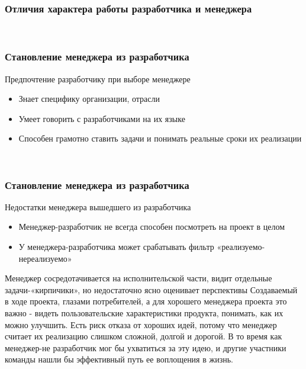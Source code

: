 \documentclass{../industrial-development}
\begin{document}
~\cite{How_to_be_a_good_IT-manager}

\begin{frame} \frametitle{Отличия характера работы разработчика и менеджера}
\end{frame}
\lecturenotes

~\cite{How_to_be_a_good_IT-manager}

\begin{frame} \frametitle{Становление менеджера из разработчика}
	\begin{block}{Предпочтение разработчику при выборе менеджере}
	 \begin{itemize}
                        \item Знает специфику организации, отрасли
			\item Умеет говорить с разработчиками на их языке
			\item Способен грамотно ставить задачи и понимать реальные сроки их реализации
		\end{itemize}
 	\end{block}
\end{frame}
\lecturenotes

~\cite{How_to_be_a_good_IT-manager}


\begin{frame} \frametitle{Становление менеджера из разработчика}
	\begin{block}{Недостатки менеджера вышедшего из разработчика}
	 \begin{itemize}
			\item Менеджер\nobreakdash-разработчик не всегда способен посмотреть на проект в целом
			\item У менеджера-разработчика может срабатывать фильтр «реализуемо\nobreakdash-нереализуемо»
		\end{itemize}
 	\end{block}
\end{frame}
\lecturenotes
Менеджер сосредотачивается на исполнительской части, видит отдельные задачи\nobreakdash-«кирпичики», но недостаточно ясно оценивает перспективы
Создаваемый в ходе проекта, глазами потребителей, а для хорошего менеджера проекта это важно \nobreakdash- видеть пользовательские характеристики продукта, понимать, как их можно улучшить.
Есть риск отказа от хороших идей, потому что менеджер считает их реализацию слишком сложной, долгой и дорогой. В то время как менеджер-не разработчик мог бы ухватиться за эту идею, и другие участники команды нашли бы эффективный путь ее воплощения в жизнь.
\end{document}
